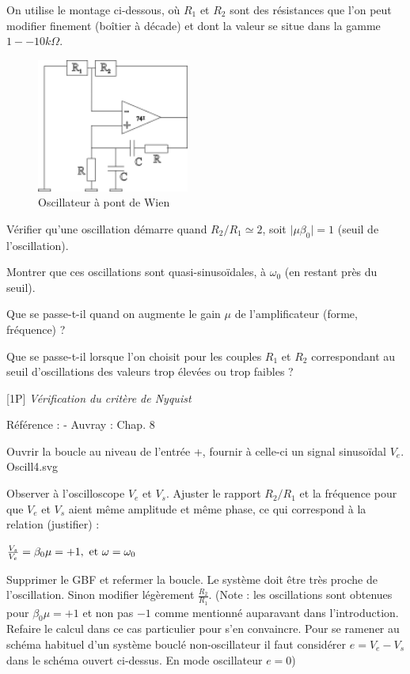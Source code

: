 \documentclass{article}%
\begin{document}
On utilise le montage ci-dessous, où $R_1$ et $R_2$ sont des résistances que l'on peut modifier finement (boîtier à décade) et dont la valeur se situe dans la gamme $1--10k \Omega $.
\begin{figure}
	\centerline{\includegraphics[width=5cm]{images-exp/Oscill3.png}}
	\caption{Oscillateur à pont de Wien}
\end{figure}

Vérifier qu'une oscillation démarre quand $R_2 /R_1 \simeq 2$, soit $\vert \mu \beta_0\vert = 1$ (seuil de l'oscillation).

Montrer que ces oscillations sont quasi-sinusoïdales, à $\omega_0$ (en restant près du seuil).

Que se passe-t-il quand on augmente le gain $\mu$ de l'amplificateur (forme, fréquence) ?

Que se passe-t-il lorsque l'on choisit pour les couples $R_1$ et $R_2$ correspondant au seuil d'oscillations des valeurs trop élevées ou trop faibles ?


[1P] \textit{Vérification du critère de Nyquist}

Référence : - Auvray : Chap. 8

Ouvrir la boucle au niveau de l'entrée +, fournir à celle-ci un signal sinusoïdal $V_e$.
Oscill4.svg

Observer à l'oscilloscope $V_e $ et $V_s$. Ajuster le rapport $R_2 /R_1$ et la fréquence pour que $V_e$ et $V_s$ aient même amplitude et même phase, ce qui correspond à la relation (justifier) :

    $ \frac{V_s }{V_e } = \beta_0 \mu = + 1, \hbox{ et }\omega=\omega_0$

Supprimer le GBF et refermer la boucle. Le système doit être très proche de l'oscillation. Sinon modifier légèrement $\frac{R_2}{R_1 }$. (Note : les oscillations sont obtenues pour $\beta_0 \mu=+1$ et non pas $-1$ comme mentionné auparavant dans l'introduction. Refaire le calcul dans ce cas particulier pour s'en convaincre. Pour se ramener au schéma habituel d'un système bouclé non-oscillateur il faut considérer $e=V_e-V_s$ dans le schéma ouvert ci-dessus. En mode oscillateur $e=0$)
\end{document}
